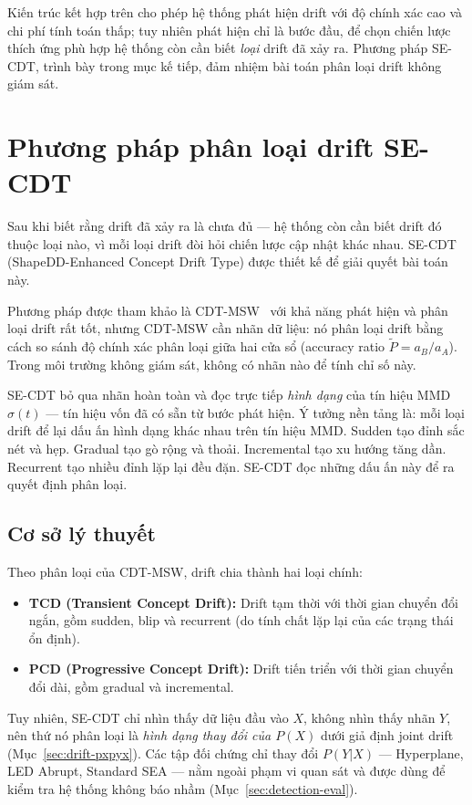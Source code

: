Kiến trúc kết hợp trên cho phép hệ thống phát hiện drift với độ chính xác cao và chi phí tính toán thấp; tuy nhiên phát hiện chỉ là bước đầu, để chọn chiến lược thích ứng phù hợp hệ thống còn cần biết \textit{loại} drift đã xảy ra. Phương pháp SE-CDT, trình bày trong mục kế tiếp, đảm nhiệm bài toán phân loại drift không giám sát.

\section{Phương pháp phân loại drift SE-CDT}
\label{sec:shaped-cdt}

Sau khi biết rằng drift đã xảy ra là chưa đủ --- hệ thống còn cần biết drift đó thuộc loại nào, vì mỗi loại drift đòi hỏi chiến lược cập nhật khác nhau. SE-CDT (ShapeDD-Enhanced Concept Drift Type) được thiết kế để giải quyết bài toán này.

Phương pháp được tham khảo là CDT-MSW~\cite{guo2022cdtmsw} với khả năng phát hiện và phân loại drift rất tốt, nhưng CDT-MSW cần nhãn dữ liệu: nó phân loại drift bằng cách so sánh độ chính xác phân loại giữa hai cửa sổ (accuracy ratio $\tilde{P} = a_B / a_A$). Trong môi trường không giám sát, không có nhãn nào để tính chỉ số này.

SE-CDT bỏ qua nhãn hoàn toàn và đọc trực tiếp \textit{hình dạng} của tín hiệu MMD $\sigma(t)$ --- tín hiệu vốn đã có sẵn từ bước phát hiện. Ý tưởng nền tảng là: mỗi loại drift để lại dấu ấn hình dạng khác nhau trên tín hiệu MMD. Sudden tạo đỉnh sắc nét và hẹp. Gradual tạo gò rộng và thoải. Incremental tạo xu hướng tăng dần. Recurrent tạo nhiều đỉnh lặp lại đều đặn. SE-CDT đọc những dấu ấn này để ra quyết định phân loại.

\subsection{Cơ sở lý thuyết}
Theo phân loại của CDT-MSW, drift chia thành hai loại chính:
\begin{itemize}
	\item \textbf{TCD (Transient Concept Drift):} Drift tạm thời với thời gian chuyển đổi ngắn, gồm sudden, blip và recurrent (do tính chất lặp lại của các trạng thái ổn định).
	\item \textbf{PCD (Progressive Concept Drift):} Drift tiến triển với thời gian chuyển đổi dài, gồm gradual và incremental.
\end{itemize}

Tuy nhiên, SE-CDT chỉ nhìn thấy dữ liệu đầu vào $X$, không nhìn thấy nhãn $Y$, nên thứ nó phân loại là \textit{hình dạng thay đổi của $P(X)$} dưới giả định joint drift (Mục~\ref{sec:drift-pxpyx}). Các tập đối chứng chỉ thay đổi $P(Y|X)$ --- Hyperplane, LED Abrupt, Standard SEA --- nằm ngoài phạm vi quan sát và được dùng để kiểm tra hệ thống không báo nhầm (Mục~\ref{sec:detection-eval}).

